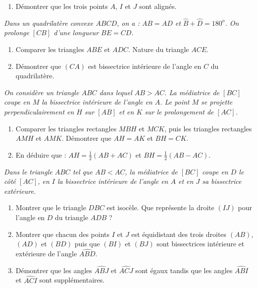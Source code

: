 \begin{itemize}
\begin{enumerate}
\item Démontrer que les trois points $A$, $I$ et $J$ sont alignés.
\end{enumerate}
\it Dans un quadrilatère convexe $ABCD$, on a : $AB=AD$ et $\widehat{B}+\widehat{D}=180^o$. On prolonge $[CB]$ d'une longueur $BE=CD$. \begin{enumerate}
\item Comparer les triangles $ABE$ et $ADC$. Nature du triangle $ACE$. 
\item Démontrer que $(CA)$ est bissectrice intérieure de l'angle en $C$ du quadrilatère.
\end{enumerate}
\it On considère un triangle $ABC$ dans lequel $AB>AC$. La médiatrice de $[BC]$ coupe en $M$ la bissectrice intérieure de l'angle en $A$. Le point $M$ se projette perpendiculairement en $H$ sur $[AB]$ et en $K$ sur le prolongement de $[AC]$.
\begin{enumerate}
\item Comparer les triangles rectangles $MBH$ et $MCK$, puis les triangles rectangles $AMH$ et $AMK$. Démontrer que $AH=AK$ et $BH=CK$. 
\item En déduire que : $AH = \frac12(AB+AC)$ et $BH = \frac12(AB-AC)$.
\end{enumerate}
\it Dans le triangle $ABC$ tel que $AB<AC$, la médiatrice de $[BC]$ coupe en $D$ le côté $[AC]$, en $I$ la bissectrice intérieure de l'angle en $A$ et en $J$ sa bissectrice extérieure.
\begin{enumerate}
\item Montrer que le triangle $DBC$ est isocèle. Que 
représente la droite $(IJ)$ pour l'angle en $D$ du triangle $ADB$ ?
\item Montrer que chacun des points $I$ et $J$ est équidistant des trois droites $(AB)$, $(AD)$ et $(BD)$ puis que $(BI)$ et $(BJ)$ sont bissectrices intérieure
et extérieure de l'angle $\widehat{ABD}$. 
\item Démontrer que les angles $\widehat{ABJ}$ et
$\widehat{ACJ}$ sont égaux tandis que les angles 
$\widehat{ABI}$ et $\widehat{ACI}$ sont supplémentaires.
\end{enumerate}
\end{itemize}








